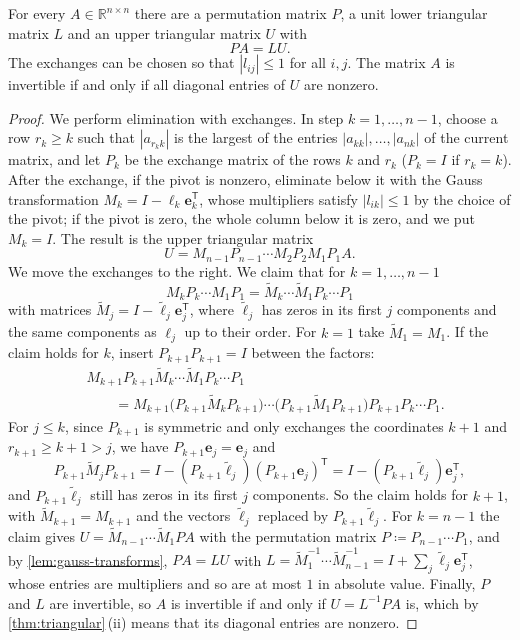 \begin{theorem}
\label{thm:plu}
For every $A\in\mathbb R^{n\times n}$ there are a permutation matrix $P$, a unit lower triangular matrix $L$ and an upper triangular matrix $U$ with
\[
PA=LU .
\]
The exchanges can be chosen so that $|l_{ij}|\le1$ for all $i,j$. The matrix $A$ is invertible if and only if all diagonal entries of $U$ are nonzero.
\end{theorem}

\begin{proof}
We perform elimination with exchanges. In step $k=1,\ldots,n-1$, choose a row $r_k\ge k$ such that $|a_{r_kk}|$ is the largest of the entries $|a_{kk}|,\ldots,|a_{nk}|$ of the current matrix, and let $P_k$ be the exchange matrix of the rows $k$ and $r_k$ ($P_k=I$ if $r_k=k$). After the exchange, if the pivot is nonzero, eliminate below it with the Gauss transformation $M_k=I-\boldsymbol\ell_k\mathbf e_k^{\mathsf T}$, whose multipliers satisfy $|l_{ik}|\le1$ by the choice of the pivot; if the pivot is zero, the whole column below it is zero, and we put $M_k=I$. The result is the upper triangular matrix
\[
U=M_{n-1}P_{n-1}\cdots M_2P_2M_1P_1A .
\]
We move the exchanges to the right. We claim that for $k=1,\ldots,n-1$
\[
M_kP_k\cdots M_1P_1=\tilde M_k\cdots\tilde M_1P_k\cdots P_1
\]
with matrices $\tilde M_j=I-\tilde{\boldsymbol\ell}_j\mathbf e_j^{\mathsf T}$, where $\tilde{\boldsymbol\ell}_j$ has zeros in its first $j$ components and the same components as $\boldsymbol\ell_j$ up to their order. For $k=1$ take $\tilde M_1=M_1$. If the claim holds for $k$, insert $P_{k+1}P_{k+1}=I$ between the factors:
\[
\begin{aligned}
&M_{k+1}P_{k+1}\tilde M_k\cdots\tilde M_1P_k\cdots P_1\\
&\qquad=M_{k+1}\bigl(P_{k+1}\tilde M_kP_{k+1}\bigr)\cdots\bigl(P_{k+1}\tilde M_1P_{k+1}\bigr)P_{k+1}P_k\cdots P_1 .
\end{aligned}
\]
For $j\le k$, since $P_{k+1}$ is symmetric and only exchanges the coordinates $k+1$ and $r_{k+1}\ge k+1>j$, we have $P_{k+1}\mathbf e_j=\mathbf e_j$ and
\[
P_{k+1}\tilde M_jP_{k+1}=I-(P_{k+1}\tilde{\boldsymbol\ell}_j)(P_{k+1}\mathbf e_j)^{\mathsf T}=I-(P_{k+1}\tilde{\boldsymbol\ell}_j)\mathbf e_j^{\mathsf T},
\]
and $P_{k+1}\tilde{\boldsymbol\ell}_j$ still has zeros in its first $j$ components. So the claim holds for $k+1$, with $\tilde M_{k+1}=M_{k+1}$ and the vectors $\tilde{\boldsymbol\ell}_j$ replaced by $P_{k+1}\tilde{\boldsymbol\ell}_j$. For $k=n-1$ the claim gives $U=\tilde M_{n-1}\cdots\tilde M_1PA$ with the permutation matrix $P\coloneqq P_{n-1}\cdots P_1$, and by \cref{lem:gauss-transforms}, $PA=LU$ with $L=\tilde M_1^{-1}\cdots\tilde M_{n-1}^{-1}=I+\sum_j\tilde{\boldsymbol\ell}_j\mathbf e_j^{\mathsf T}$, whose entries are multipliers and so are at most $1$ in absolute value. Finally, $P$ and $L$ are invertible, so $A$ is invertible if and only if $U=L^{-1}PA$ is, which by \cref{thm:triangular}\,(ii) means that its diagonal entries are nonzero.
\end{proof}

